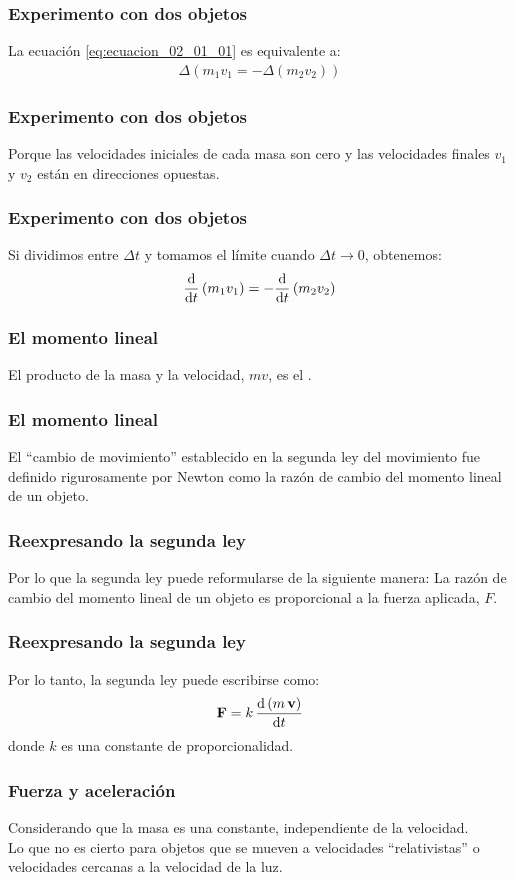 \documentclass[12pt]{beamer}
\begin{document}
\begin{frame}
\frametitle{Experimento con dos objetos}
La ecuación \ref{eq:ecuacion_02_01_01} es equivalente a:
\pause
\begin{align}
\Delta \left( m_{1} v_{1} = - \Delta \left( m_{2} v_{2} \right) \right)
\label{eq:ecuacion_02_01_02}
\end{align}
\end{frame}
\begin{frame}
\frametitle{Experimento con dos objetos}
Porque las velocidades iniciales de cada masa son cero y las velocidades finales $v_{1}$ y $v_{2}$ están
en direcciones opuestas.
\end{frame}
\begin{frame}
\frametitle{Experimento con dos objetos}
Si dividimos entre $\Delta t$ y tomamos el límite cuando $\Delta t \to 0$, obtenemos:
\pause
\begin{align}
\dv{t} \left( m_{1} v_{1} \right) = - \dv{t} \left( m_{2} v_{2} \right)
\label{eq:ecuacion_02_01_03}
\end{align}
\end{frame}
\begin{frame}
\frametitle{El momento lineal}
El producto de la masa y la velocidad, $m v$, es el .
\end{frame}
\begin{frame}
\frametitle{El momento lineal}
El \enquote{cambio de movimiento} establecido en la segunda ley del movimiento fue definido rigurosamente por Newton como la razón de cambio del momento lineal de un objeto.
\end{frame}
\begin{frame}
\frametitle{Reexpresando la segunda ley}
Por lo que la segunda ley puede reformularse de la siguiente manera: \pause La razón de cambio del momento lineal de un objeto es proporcional a la fuerza aplicada, $F$.
\end{frame}
\begin{frame}
\frametitle{Reexpresando la segunda ley}
Por lo tanto, la segunda ley puede escribirse como:
\begin{align}
\vb{F} = k \, \dv{\left( m \, \vb{v} \right)}{t}
\label{eq:ecuacion_02_01_04}
\end{align}
donde $k$ es una constante de proporcionalidad.
\end{frame}
\begin{frame}
\frametitle{Fuerza y aceleración}
Considerando que la masa es una constante, independiente de la velocidad.
\\
\bigskip
\pause
Lo que no es cierto para objetos que se mueven a velocidades \enquote{relativistas} o velocidades cercanas a la velocidad de la luz.
\end{frame}
\end{document}
